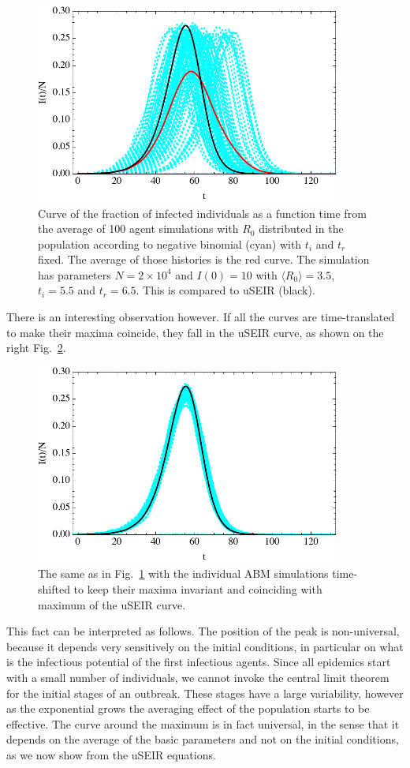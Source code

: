 \documentclass[a4paper,oneside,11pt]{article}
\begin{document}
 \begin{figure}[h!]
  \centering
\includegraphics[width=10cm]{turtlesraw.pdf}
  \caption{ Curve of the fraction of infected individuals as a function time from the average of 100 agent simulations with $R_0$ distributed in the population according to negative binomial (cyan) with $t_i$ and $t_r$ fixed. The average of those histories is the red curve. The simulation has parameters  $N= 2 \times 10^4$ and $I(0)=10$ with $\langle R_0\rangle=3.5$, $t_i=5.5$ and $t_r=6.5$. This is compared to uSEIR (black).}
  \label{fig:turtlesraw}
   \end{figure}
  There is an interesting observation however. If all the curves are time-translated  to make their maxima coincide, they fall in the uSEIR curve, as shown on the right Fig.~\ref{fig:turtlesshift}.
  \begin{figure}[h!]
  \centering
\includegraphics[width=10cm]{turtlesshift.pdf}
  \caption{ The same as in Fig.~\ref{fig:turtlesraw} with the individual ABM simulations time-shifted to keep their maxima invariant and coinciding with maximum of the uSEIR curve.}
  \label{fig:turtlesshift}
   \end{figure}

  This fact can be interpreted as follows. The position of the peak is non-universal, because it depends very sensitively on the initial conditions, in particular on what is the infectious potential of the first infectious agents. Since all epidemics start with a small number of individuals, we cannot invoke the central limit theorem for the initial stages of an outbreak. These stages have a large variability, however as the exponential grows the averaging effect of the population starts to be effective. The curve around the maximum is in fact universal, in the sense that it depends on the average of the basic parameters and not on the initial conditions, as we now show from the uSEIR equations.
\end{document}
